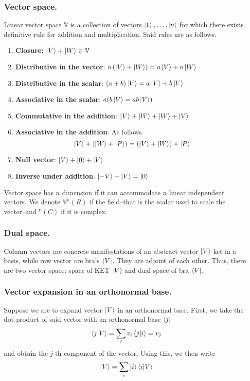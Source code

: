 \documentclass[../main.tex]{subfiles}
\begin{document}
\subsubsection*{Vector space.}
Linear vector space $\mathbb{V}$ is a collection of vectors $\ket{1},\dots,\ket{n}$ for which there exists definitive rule for addition and multiplication.
Said rules are as follows.
\begin{enumerate}
	\item \textbf{Closure:} $\ket{V}+\ket{W}\in \mathbb{V}$
	\item \textbf{Distributive in the vector}: $a\left(\ket{V}+\ket{W}\right)=a\ket{V}+a \ket{W}$
	\item \textbf{Distributive in the scalar}: $(a+b)\ket{V}=a \ket{V}+b \ket{V}$
	\item \textbf{Associative in the scalar}: $a(b\ket{V}=ab\ket{V})$
	\item \textbf{Commutative in the addition}: $\ket{V}+\ket{W}+\ket{W}+\ket{V}$
	\item \textbf{Associative in the addition}: As follows.
	      \begin{equation*}
		      \ket{V}+\left(\ket{W}+\ket{P}\right)=\left(\ket{V}+\ket{W}\right)+\ket{P}
	      \end{equation*}
	\item \textbf{Null vector}: $\ket{V}+\ket{0}+\ket{V}$
	\item \textbf{Inverse under addition}: $\ket{-V}+\ket{V}=\ket{0}$
\end{enumerate}

Vector space has $n$ dimension if it can accommodate $n$ linear independent vectors.
We denote $\mathbb{V}^n(R)$ if the field--that is the scalar used to scale the vector--and $\mathbb{^n}(C)$ if it is complex.

\subsubsection*{Dual space.}
Column vectors are concrete manifestations of an abstract vector $\ket{V}$ ket in a basis, while row vector are bra's $\bra{V}$.
They are adjoint of each other.
Thus, there are two vector space: space of KET $\ket{V}$ and dual space of bra $\bra{V}$.

\subsubsection*{Vector expansion in an orthonormal base.}
Suppose we are to expand vector $\ket{V}$ in an  orthonormal base.
First, we take the dot product of said vector with an orthonormal base $\bra{j}$
\begin{equation*}
	\braket{j|V}=\sum_i v_i\braket{j|i}=v_j
\end{equation*}
and obtain the $j$-th component of the vector.
Using this, we then write
\begin{equation*}
	\ket{V}=\sum_i \ket{i}\braket{i|V}
\end{equation*}
\end{document}
